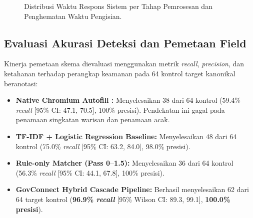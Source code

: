 \documentclass[conference]{IEEEtran}
\begin{document}
\begin{figure}[!htbp]
\centering
{}
\caption{Distribusi Waktu Respons Sistem per Tahap Pemrosesan dan Penghematan Waktu Pengisian.}
\label{fig:response_time}
\end{figure}

\subsection{Evaluasi Akurasi Deteksi dan Pemetaan Field}
Kinerja pemetaan skema dievaluasi menggunakan metrik \textit{recall}, \textit{precision}, dan ketahanan terhadap perangkap keamanan pada 64 kontrol target kanonikal beranotasi:
\begin{itemize}[leftmargin=*]
    \item \textbf{Native Chromium Autofill \cite{chromium}:} Menyelesaikan 38 dari 64 kontrol (59.4\% \textit{recall} [95\% CI: 47.1, 70.5], 100\% presisi). Pendekatan ini gagal pada penamaan singkatan warisan dan penamaan acak.
    \item \textbf{TF-IDF + Logistic Regression Baseline:} Menyelesaikan 48 dari 64 kontrol (75.0\% \textit{recall} [95\% CI: 63.2, 84.0], 98.0\% presisi).
    \item \textbf{Rule-only Matcher (Pass 0--1.5):} Menyelesaikan 36 dari 64 kontrol (56.3\% \textit{recall} [95\% CI: 44.1, 67.8], 100\% presisi).
    \item \textbf{GovConnect Hybrid Cascade Pipeline:} Berhasil menyelesaikan 62 dari 64 target kontrol (\textbf{96.9\% \textit{recall}} [95\% Wilson CI: 89.3, 99.1], \textbf{100.0\% presisi}).
\end{itemize}
\end{document}
